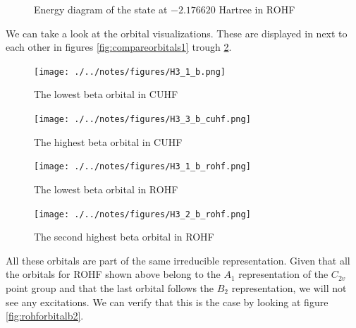 \documentclass[twoside,twocolumn,9pt]{article}
\begin{document}
\begin{figure}[h]
  \begin{center}
  \end{center}
  \caption{Energy diagram of the state at $-2.176620$ Hartree in ROHF}
  \label{fig:energydiag3}
\end{figure}

We can take a look at the orbital visualizations.  These are displayed in next to each other in figures \ref{fig:compareorbitals1}
trough \ref{fig:compareorbitals4}. \\
\begin{figure}[ht]
  \begin{minipage}[b]{0.5\linewidth}
    \texttt{[image: ./../notes/figures/H3\_1\_b.png]}
    \caption{The lowest beta orbital in CUHF}
    \label{fig:compareorbitals1}
  \end{minipage}
  \begin{minipage}[b]{0.5\linewidth}
    \texttt{[image: ./../notes/figures/H3\_3\_b\_cuhf.png]}
    \caption{The highest beta orbital in CUHF}
    \label{fig:compareorbitals2}
  \end{minipage}
  \begin{minipage}[b]{0.5\linewidth}
    \texttt{[image: ./../notes/figures/H3\_1\_b\_rohf.png]}
    \caption{The lowest beta orbital in ROHF}
    \label{fig:compareorbitals3}
  \end{minipage}
  \begin{minipage}[b]{0.5\linewidth}
    \texttt{[image: ./../notes/figures/H3\_2\_b\_rohf.png]}
    \caption{The second highest beta orbital in ROHF}
    \label{fig:compareorbitals4}
  \end{minipage}
\end{figure}
All these orbitals are part of the same irreducible representation. Given that all the orbitals for ROHF shown above belong to
the $A_1$ representation of the $C_{2v}$ point group and that the last orbital follows the $B_2$ representation, we will not see any excitations. We can verify that this is the case
by looking at figure \ref{fig:rohforbitalb2}.
\end{document}
